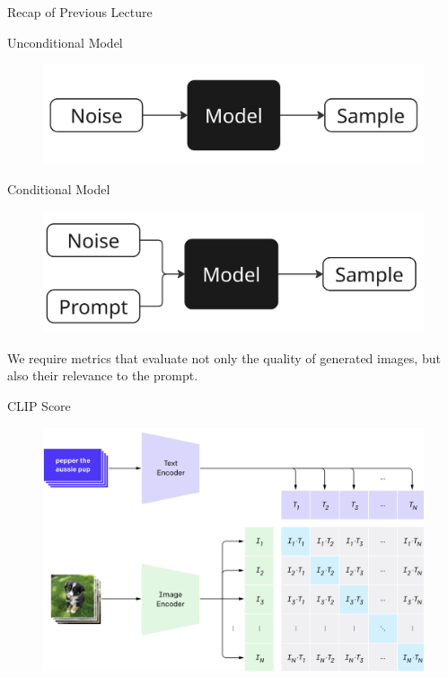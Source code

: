 \documentclass{beamer}
\begin{document}
\begin{frame}{Recap of Previous Lecture}
	\vspace{-0.2cm}
	\begin{minipage}{0.5\linewidth}
		\begin{block}{Unconditional Model}
			\begin{figure}
				\includegraphics[width=0.95\linewidth]{figs/uncond_model}
			\end{figure}
		\end{block}
	\end{minipage}%
	\begin{minipage}{0.5\linewidth}
		\vspace{0.2cm}
		\begin{block}{Conditional Model}
			\begin{figure}
				\includegraphics[width=0.95\linewidth]{figs/cond_model}
			\end{figure}
		\end{block}
	\end{minipage}
	We require metrics that evaluate not only the quality of generated images, but also their relevance to the prompt.
	\begin{block}{CLIP Score}
		\begin{figure}
			\includegraphics[width=0.5\linewidth]{figs/clip}
		\end{figure}
	\end{block}
\end{frame}
\end{document}
